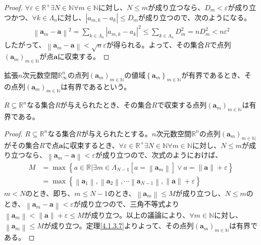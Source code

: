 \documentclass[dvipdfmx]{jsarticle}
\begin{document}
\begin{proof}
$\forall\varepsilon \in \mathbb{R}^{+}\exists N \in \mathbb{N}\forall m \in \mathbb{N}$に対し、$N \leq m$が成り立つなら、$D_{m} < \varepsilon$が成り立つかつ、$\forall k \in \varLambda_{n}$に対し、$\left| a_{m,k} - a_{k} \right| \leq D_{m}$が成り立つので、次のようになる。
\begin{align*}
\left\| \mathbf{a}_{m} - \mathbf{a} \right\|^{2} = \sum_{k \in \varLambda_{n}} \left| a_{m,k} - a_{k} \right|^{2} \leq \sum_{k \in \varLambda_{n}} D_{m}^{2} = nD_{m}^{2} < n\varepsilon^{2}
\end{align*}
したがって、$\left\| \mathbf{a}_{m} - \mathbf{a} \right\| < \sqrt{n}\varepsilon$が得られる。よって、その集合$R$で点列$\left( \mathbf{a}_{m} \right)_{m \in \mathbb{N}}$が点$\mathbf{a}$に収束する。
\end{proof}
\begin{dfn}
拡張$n$次元数空間$\mathbb{R}_{\infty}^{n}$の点列$\left( \mathbf{a}_{m} \right)_{m \in \mathbb{N}}$の値域$\left\{ \mathbf{a}_{m} \right\}_{m \in \mathbb{N}}$が有界であるとき、その点列$\left( \mathbf{a}_{m} \right)_{m \in \mathbb{N}}$は有界であるという。
\end{dfn}
\begin{thm}\label{4.1.4.7}
$R \subseteq \mathbb{R}^{n}$なる集合$R$が与えられたとき、その集合$R$で収束する点列$\left( \mathbf{a}_{m} \right)_{m \in \mathbb{N}}$は有界である。
\end{thm}
\begin{proof}
$R \subseteq \mathbb{R}^{n}$なる集合$R$が与えられたとする。$n$次元数空間$\mathbb{R}^{n}$の点列$\left( \mathbf{a}_{m} \right)_{m \in \mathbb{N}}$がその集合$R$で点$\mathbf{a}$に収束するとき、$\forall\varepsilon \in \mathbb{R}^{+}\exists N \in \mathbb{N}\forall m \in \mathbb{N}$に対し、$N \leq m$が成り立つなら、$\left\| \mathbf{a}_{m} - \mathbf{a} \right\| < \varepsilon$が成り立つので、次式のようにおけば、
\begin{align*}
M &= \max\left\{ a \in \mathbb{R}|\exists m \in \varLambda_{N - 1}\left[ a = \left\| \mathbf{a}_{m} \right\| \right] \vee a = \left\| \mathbf{a} \right\| + \varepsilon \right\}\\
&= \max\left\{ \left\| \mathbf{a}_{1} \right\|,\left\| \mathbf{a}_{2} \right\|,\cdots\left\| \mathbf{a}_{N - 1} \right\|,\left\| \mathbf{a} \right\| + \varepsilon \right\}
\end{align*}
$m < N$のとき、即ち、$m \leq N - 1$のとき、$\left\| \mathbf{a}_{m} \right\| \leq M$が成り立つし、$N \leq m$のとき、$\left\| \mathbf{a}_{m} - \mathbf{a} \right\| < \varepsilon$が成り立つので、三角不等式より$\left\| \mathbf{a}_{m} \right\| < \left\| \mathbf{a} \right\| + \varepsilon \leq M$が成り立つ。以上の議論により、$\forall m \in \mathbb{N}$に対し、$\left\| \mathbf{a}_{m} \right\| \leq M$が成り立つ。定理\ref{4.1.3.7}よりよって、その点列$\left( \mathbf{a}_{m} \right)_{m \in \mathbb{N}}$は有界である。
\end{proof}
\end{document}
